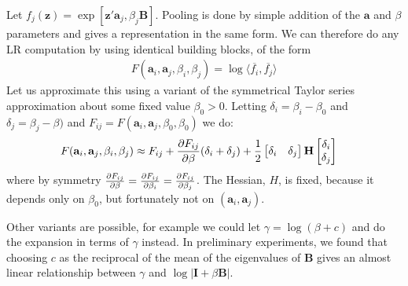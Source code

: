 \documentclass[a4paper,oneside,12pt,english]{report}
\def\zvec{\mathbf{z}}
\def\ND{\mathcal{N}}
\def\expv#1#2{\bigl\langle#1\bigr\rangle_{#2}}
\def\detm#1{\lvert#1\rvert}
\def\Bmat{\mathbf{B}}
\def\Hmat{\mathbf{H}}
\def\Imat{\mathbf{I}}
\def\muvec{\boldsymbol{\mu}}
\def\avec{\mathbf{a}}
\def\dot#1#2{\expv{#1,#2}{}}
\def\normal#1{\overline{#1}}
\def\dotn#1#2{\dot{\normal{#1}}{\normal{#2}}}
\def\bmat#1{\begin{bmatrix}#1\end{bmatrix}}
\begin{document}
Let $f_j(\zvec)=\exp[\zvec'\avec_j,\beta_j\Bmat]$. Pooling is done by simple addition of the $\avec$ and $\beta$ parameters and gives a representation in the same form. We can therefore do any LR computation by using identical building blocks, of the form 
\begin{align}
F(\avec_i,\avec_j,\beta_i,\beta_j) = \log\dotn{f_i}{f_j}
\end{align}
Let us approximate this using a variant of the symmetrical Taylor series approximation about some fixed value $\beta_0>0$. Letting $\delta_i=\beta_i-\beta_0$ and $\delta_j=\beta_j-\beta)$ and $F_{ij}=F(\avec_i,\avec_j,\beta_0,\beta_0)$ we do:
\begin{align}
F(\avec_i,\avec_j,\beta_i,\beta_j) &\approx F_{ij} + \pd{F_{ij}}{\beta}(\delta_i+\delta_j) +\frac12\bmat{\delta_i&\delta_j}\Hmat\bmat{\delta_i\\ \delta_j} 
\end{align} 
where by symmetry $\frac{\partial F_{ij}}{\partial\beta}=\frac{\partial F_{ij}}{\partial\beta_i}=\frac{\partial F_{ij}}{\partial\beta_j}$. The Hessian, $H$, is fixed, because it depends only on $\beta_0$, but fortunately not on $(\avec_i,\avec_j)$.  

Other variants are possible, for example we could let $\gamma=\log(\beta+c)$ and do the expansion in terms of $\gamma$ instead. In preliminary experiments, we found that choosing $c$ as the reciprocal of the mean of the eigenvalues of $\Bmat$ gives an almost linear relationship between $\gamma$ and $\log\detm{\Imat+\beta\Bmat}$.


%
%
\end{document}
